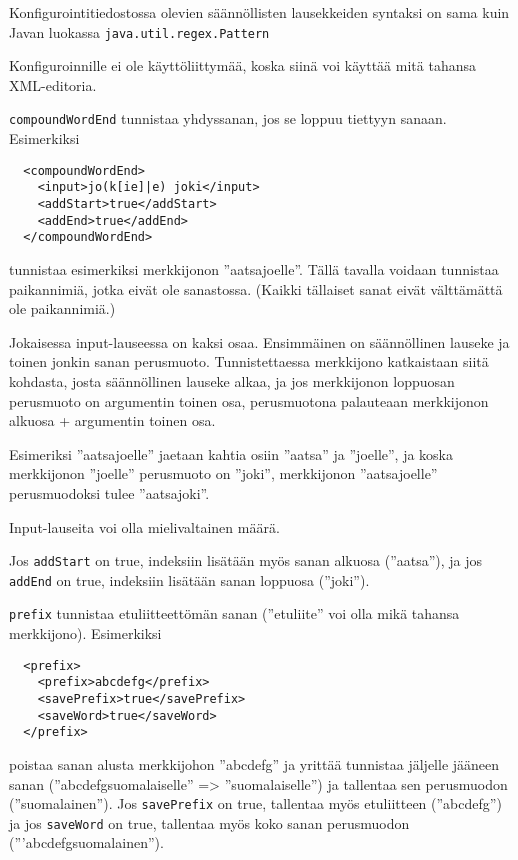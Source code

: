 \documentclass[12pt]{article}
\begin{document}
Konfigurointitiedostossa olevien säännöllisten lausekkeiden syntaksi on
sama kuin Javan luokassa \verb=java.util.regex.Pattern=

Konfiguroinnille ei ole käyttöliittymää, koska siinä voi käyttää mitä
tahansa XML-editoria.




\bigskip
\verb|compoundWordEnd| tunnistaa yhdyssanan, jos se loppuu tiettyyn sanaan.
Esimerkiksi

\begin{verbatim}
  <compoundWordEnd>
    <input>jo(k[ie]|e) joki</input>
    <addStart>true</addStart>
    <addEnd>true</addEnd>
  </compoundWordEnd>
\end{verbatim}

tunnistaa esimerkiksi merkkijonon ''aatsajoelle''. Tällä tavalla
voidaan tunnistaa paikannimiä, jotka eivät ole sanastossa. (Kaikki tällaiset
sanat eivät välttämättä ole paikannimiä.)

Jokaisessa input-lauseessa on kaksi osaa. Ensimmäinen on säännöllinen
lauseke ja toinen jonkin sanan perusmuoto. Tunnistettaessa merkkijono
katkaistaan siitä kohdasta, josta säännöllinen lauseke alkaa, ja jos
merkkijonon loppuosan perusmuoto on argumentin toinen osa,
perusmuotona palauteaan merkkijonon alkuosa + argumentin toinen osa.

Esimeriksi ''aatsajoelle'' jaetaan kahtia osiin ''aatsa'' ja
''joelle'', ja koska merkkijonon ''joelle'' perusmuoto on ''joki'',
merkkijonon ''aatsajoelle'' perusmuodoksi tulee ''aatsajoki''.

Input-lauseita voi olla mielivaltainen määrä.

Jos \verb|addStart| on true, indeksiin lisätään myös sanan alkuosa (''aatsa''), ja jos
\verb|addEnd| on true, indeksiin lisätään sanan loppuosa (''joki'').



\bigskip
\verb|prefix| tunnistaa etuliitteettömän sanan (''etuliite'' voi olla
mikä tahansa merkkijono). Esimerkiksi

\begin{verbatim}
  <prefix>
    <prefix>abcdefg</prefix>
    <savePrefix>true</savePrefix>
    <saveWord>true</saveWord>
  </prefix>
\end{verbatim}

poistaa sanan alusta merkkijohon ''abcdefg'' ja yrittää tunnistaa
jäljelle jääneen sanan (''abcdefgsuomalaiselle'' => ''suomalaiselle'')
ja tallentaa sen perusmuodon (''suomalainen''). Jos \verb|savePrefix|
on true, tallentaa myös etuliitteen (''abcdefg'') ja jos
\verb|saveWord| on true, tallentaa myös koko sanan perusmuodon
('''abcdefgsuomalainen'').
\end{document}
